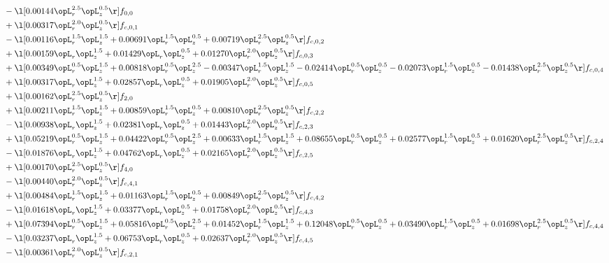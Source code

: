 \begin{alignat}{2}
& - \l[  0.00144 \opL_r^{2.5} \opL_z^{0.5}  \r] f_{0,0} \nonumber \\ 
& + \l[  0.00317 \opL_r^{2.0} \opL_z^{0.5}  \r] f_{c,0,1} \nonumber \\ 
& - \l[  0.00116 \opL_r^{1.5} \opL_z^{1.5} +  0.00691 \opL_r^{1.5} \opL_z^{0.5} +  0.00719 \opL_r^{2.5} \opL_z^{0.5}  \r] f_{c,0,2} \nonumber \\ 
& + \l[  0.00159 \opL_r \opL_z^{1.5} +  0.01429 \opL_r \opL_z^{0.5} +  0.01270 \opL_r^{2.0} \opL_z^{0.5}  \r] f_{c,0,3} \nonumber \\ 
& + \l[  0.00349 \opL_r^{0.5} \opL_z^{1.5} +  0.00818 \opL_r^{0.5} \opL_z^{2.5}   -0.00347 \opL_r^{1.5} \opL_z^{1.5}   -0.02414 \opL_r^{0.5} \opL_z^{0.5}   -0.02073 \opL_r^{1.5} \opL_z^{0.5}   -0.01438 \opL_r^{2.5} \opL_z^{0.5}  \r] f_{c,0,4} \nonumber \\ 
& + \l[  0.00317 \opL_r \opL_z^{1.5} +  0.02857 \opL_r \opL_z^{0.5} +  0.01905 \opL_r^{2.0} \opL_z^{0.5}  \r] f_{c,0,5} \nonumber \\ 
& + \l[  0.00162 \opL_r^{2.5} \opL_z^{0.5}  \r] f_{2,0} \nonumber \\ 
& + \l[  0.00211 \opL_r^{1.5} \opL_z^{1.5} +  0.00859 \opL_r^{1.5} \opL_z^{0.5} +  0.00810 \opL_r^{2.5} \opL_z^{0.5}  \r] f_{c,2,2} \nonumber \\ 
& - \l[  0.00938 \opL_r \opL_z^{1.5} +  0.02381 \opL_r \opL_z^{0.5} +  0.01443 \opL_r^{2.0} \opL_z^{0.5}  \r] f_{c,2,3} \nonumber \\ 
& + \l[  0.05219 \opL_r^{0.5} \opL_z^{1.5} +  0.04422 \opL_r^{0.5} \opL_z^{2.5} +  0.00633 \opL_r^{1.5} \opL_z^{1.5} +  0.08655 \opL_r^{0.5} \opL_z^{0.5} +  0.02577 \opL_r^{1.5} \opL_z^{0.5} +  0.01620 \opL_r^{2.5} \opL_z^{0.5}  \r] f_{c,2,4} \nonumber \\ 
& - \l[  0.01876 \opL_r \opL_z^{1.5} +  0.04762 \opL_r \opL_z^{0.5} +  0.02165 \opL_r^{2.0} \opL_z^{0.5}  \r] f_{c,2,5} \nonumber \\ 
& + \l[  0.00170 \opL_r^{2.5} \opL_z^{0.5}  \r] f_{4,0} \nonumber \\ 
& - \l[  0.00440 \opL_r^{2.0} \opL_z^{0.5}  \r] f_{c,4,1} \nonumber \\ 
& + \l[  0.00484 \opL_r^{1.5} \opL_z^{1.5} +  0.01163 \opL_r^{1.5} \opL_z^{0.5} +  0.00849 \opL_r^{2.5} \opL_z^{0.5}  \r] f_{c,4,2} \nonumber \\ 
& - \l[  0.01618 \opL_r \opL_z^{1.5} +  0.03377 \opL_r \opL_z^{0.5} +  0.01758 \opL_r^{2.0} \opL_z^{0.5}  \r] f_{c,4,3} \nonumber \\ 
& + \l[  0.07394 \opL_r^{0.5} \opL_z^{1.5} +  0.05816 \opL_r^{0.5} \opL_z^{2.5} +  0.01452 \opL_r^{1.5} \opL_z^{1.5} +  0.12048 \opL_r^{0.5} \opL_z^{0.5} +  0.03490 \opL_r^{1.5} \opL_z^{0.5} +  0.01698 \opL_r^{2.5} \opL_z^{0.5}  \r] f_{c,4,4} \nonumber \\ 
& - \l[  0.03237 \opL_r \opL_z^{1.5} +  0.06753 \opL_r \opL_z^{0.5} +  0.02637 \opL_r^{2.0} \opL_z^{0.5}  \r] f_{c,4,5} \nonumber \\ 
& - \l[  0.00361 \opL_r^{2.0} \opL_z^{0.5}  \r] f_{c,2,1} \nonumber \\ 
\end{alignat} 



